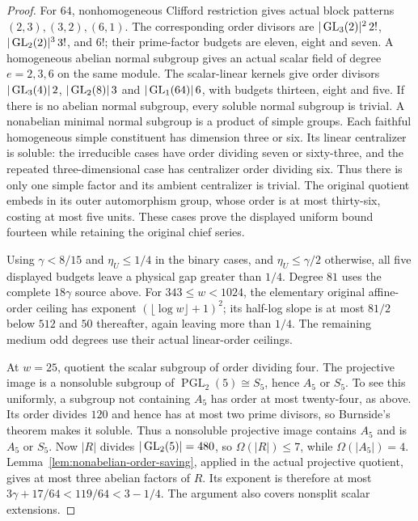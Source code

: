 \begin{proof}
For $64$, nonhomogeneous Clifford restriction gives actual block
patterns $(2,3),(3,2),(6,1)$. The corresponding order divisors are
$|\operatorname{GL}_3(2)|^2\,2!$, $|\operatorname{GL}_2(2)|^3\,3!$, and $6!$;
their prime-factor budgets are eleven, eight and seven.
A homogeneous abelian normal subgroup gives an actual scalar field
of degree $e=2,3,6$ on the same module. The scalar-linear kernels give
order divisors $|\operatorname{GL}_3(4)|\,2$, $|\operatorname{GL}_2(8)|\,3$ and
$|\operatorname{GL}_1(64)|\,6$, with budgets thirteen, eight and five.
If there is no abelian normal subgroup, every soluble normal subgroup
is trivial. A nonabelian minimal normal subgroup is a product of simple
groups. Each faithful homogeneous simple constituent has dimension
three or six. Its linear centralizer is soluble: the irreducible cases
have order dividing seven or sixty-three, and the repeated
three-dimensional case has centralizer order dividing six.
Thus there is only one simple factor and its ambient centralizer is
trivial. The original quotient embeds in its outer automorphism group,
whose order is at most thirty-six, costing at most five units.
These cases prove the displayed uniform bound fourteen while retaining
the original chief series.

Using $\gamma<8/15$ and $\eta_U\leq1/4$ in the binary cases, and
$\eta_U\leq\gamma/2$ otherwise, all five displayed budgets leave a
physical gap greater than $1/4$. Degree $81$ uses the complete
$18\gamma$ source above. For $343\leq w<1024$, the elementary original
affine-order ceiling has exponent $(\lfloor\log w\rfloor+1)^2$;
its half-log slope is at most $81/2$ below $512$ and $50$ thereafter,
again leaving more than $1/4$. The remaining medium odd degrees use
their actual linear-order ceilings.

At $w=25$, quotient the scalar subgroup of order dividing four.
The projective image is a nonsoluble subgroup of
$\operatorname{PGL}_2(5)\cong S_5$, hence $A_5$ or $S_5$.
To see this uniformly, a subgroup not containing $A_5$ has order
at most twenty-four, as above. Its order divides $120$ and hence
has at most two prime divisors, so Burnside's theorem
\cite{Burnside1904TwoPrimes} makes it soluble.
Thus a nonsoluble projective image contains $A_5$ and is $A_5$ or $S_5$.
Now $|R|$ divides $|\operatorname{GL}_2(5)|=480$, so
$\Omega(|R|)\leq7$, while $\Omega(|A_5|)=4$.
Lemma~\ref{lem:nonabelian-order-saving}, applied in the actual projective
quotient, gives at most three abelian factors of $R$. Its exponent is
therefore at most $3\gamma+17/64<119/64<3-1/4$.
The argument also covers nonsplit scalar extensions.


\end{proof}
